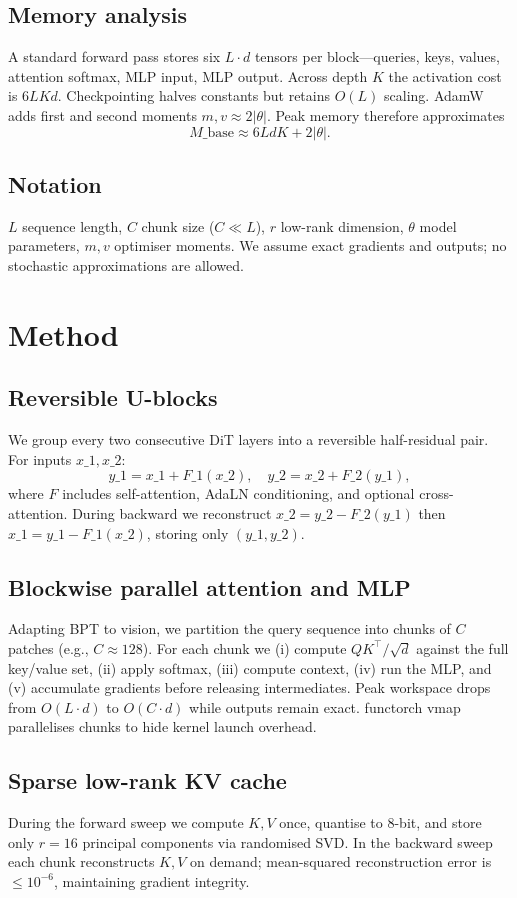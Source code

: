 \documentclass{article}
\begin{document}
\subsection{Memory analysis}
A standard forward pass stores six \(L\cdot d\) tensors per block—queries, keys, values, attention softmax, MLP input, MLP output. Across depth \(K\) the activation cost is \(6 L K d\). Checkpointing halves constants but retains \(O(L)\) scaling. AdamW adds first and second moments \(m,v\approx 2\lvert\theta\rvert\). Peak memory therefore approximates
\[ M\_{\mathrm{base}} \approx 6 L d K + 2\lvert\theta\rvert. \]
\subsection{Notation}
\(L\) sequence length, \(C\) chunk size (\(C\ll L\)), \(r\) low-rank dimension, \(\theta\) model parameters, \(m,v\) optimiser moments. We assume exact gradients and outputs; no stochastic approximations are allowed.

\section{Method}
\subsection{Reversible U-blocks}
We group every two consecutive DiT layers into a reversible half-residual pair. For inputs \(x\_1,x\_2\):
\[ y\_1 = x\_1 + F\_1(x\_2), \quad y\_2 = x\_2 + F\_2(y\_1), \]
where \(F\) includes self-attention, AdaLN conditioning, and optional cross-attention. During backward we reconstruct \(x\_2 = y\_2 - F\_2(y\_1)\) then \(x\_1 = y\_1 - F\_1(x\_2)\), storing only \((y\_1,y\_2)\).
\subsection{Blockwise parallel attention and MLP}
Adapting BPT \cite{liu-2023-blockwise} to vision, we partition the query sequence into chunks of \(C\) patches (e.g., \(C\approx 128\)). For each chunk we (i) compute \(QK^\top/\sqrt{d}\) against the full key/value set, (ii) apply softmax, (iii) compute context, (iv) run the MLP, and (v) accumulate gradients before releasing intermediates. Peak workspace drops from \(O(L\cdot d)\) to \(O(C\cdot d)\) while outputs remain exact. functorch vmap parallelises chunks to hide kernel launch overhead.
\subsection{Sparse low-rank KV cache}
During the forward sweep we compute \(K,V\) once, quantise to 8-bit, and store only \(r=16\) principal components via randomised SVD. In the backward sweep each chunk reconstructs \(K,V\) on demand; mean-squared reconstruction error is \(\le 10^{-6}\), maintaining gradient integrity.
\end{document}
